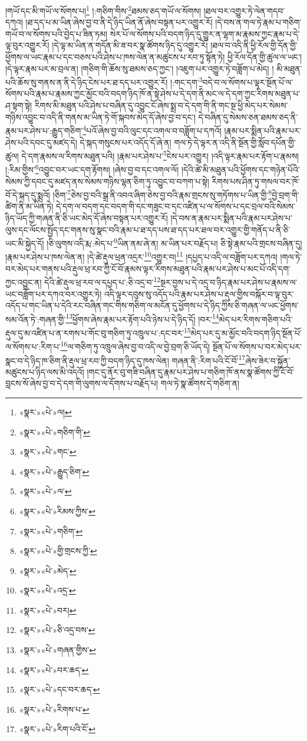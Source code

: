 །གཡོ་དང་མི་གཡོ་ལ་སོགས་པ།\footnote{«སྣར་»«པེ་»ལ།} །:གཅིག་གིས་\footnote{«སྣར་»«པེ་»གཅིག་གི་}ཐམས་ཅད་གཡོ་ལ་སོགས། །ཐལ་བར་འགྱུར་ཏེ་ལེན་གདབ་དཀའ། །ཐ་དད་པ་མ་ཡིན་ཞེས་བྱ་བ་ནི་དེ་ཉིད་ཡིན་ནོ་ཞེས་བསྟན་པར་འགྱུར་རོ། །དེ་བས་ན་གལ་ཏེ་རྣམ་པ་གཅིག་གཡོ་བ་ལ་སོགས་པའི་བྱེད་པ་ཟིན་ཏམ། སེར་པོ་ལ་སོགས་པའི་བདག་ཉིད་དུ་གྱུར་ན་ལྷག་མ་རྣམས་ཀྱང་རྣམ་པ་དེ་ལྟ་བུར་འགྱུར་རོ། །དེ་ལྟ་མ་ཡིན་ན་གདོན་མི་ཟ་བར་སྣ་ཚོགས་ཉིད་དུ་འགྱུར་རོ། །ཐལ་བ་འདི་ནི་ཕྱི་རོལ་གྱི་དོན་གྱི་ཕྱོགས་ལ་ཡང་རྣམ་པ་དང་བཅས་པའི་ཤེས་པ་ཁས་ལེན་ན་མཚུངས་པ་རབ་ཏུ་སྟོན་ཏེ། ཕྱི་རོལ་དོན་གྱི་ཚུལ་ལ་ཡང་། །དེ་ལྟར་རྣམ་པར་མ་བྲལ་ན། །གཅིག་གི་ཆོས་སུ་ཐམས་ཅད་ཀྱང་། །འཇུག་པར་འགྱུར་ཏེ་བཟློག་པ་མེད། །
མི་མཐུན་པའི་ཆོས་སུ་གནས་ན་ནི་དེ་ཉིད་ངེས་པར་ཐ་དད་པར་འགྱུར་རོ། །:གང་དག་\footnote{«སྣར་»«པེ་»གང་}བདེ་བ་ལ་སོགས་པ་ལྟར་སྔོན་པོ་ལ་སོགས་པའི་རྣམ་པ་རྣམས་ཀྱང་མྱོང་བའི་བདག་ཉིད་ཁོ་ན་སྟེ་ཤེས་པ་དེ་དག་ནི་མང་ལ་དེ་དག་ཀྱང་རིགས་མཐུན་པ་ཤ་སྟག་སྟེ། རིགས་མི་མཐུན་པའི་ཤེས་པ་བཞིན་དུ་འབྱུང་ངོ་ཞེས་སྨྲ་བ་དེ་དག་གི་ནི་གང་སྔ་ཕྱི་མེད་པར་སེམས་གཉིས་འབྱུང་བ་འདི་ནི་གནས་མ་ཡིན་ཏེ་གོ་སྐབས་མེད་དོ་ཞེས་བྱ་བ་དང་། དེ་བཞིན་དུ་སེམས་ཅན་ཐམས་ཅད་ནི་རྣམ་པར་ཤེས་པ་:རྒྱུད་གཅིག་\footnote{«སྣར་»«པེ་»རྒྱུད་ཅིག་}པའོ་ཞེས་བྱ་བའི་ལུང་དང་འགལ་བ་བཟློག་པ་དཀའོ། །རྣམ་པར་སྨིན་པའི་རྣམ་པར་ཤེས་པའི་དབང་དུ་མཛད་དེ། དེ་སྐད་གསུངས་པར་འདོད་དོ་ཞེ་ན། གལ་ཏེ་དེ་ལྟར་ན་འདི་ནི་སྔོན་གྱི་སློབ་དཔོན་གྱི་ཚུལ། དེ་དག་རྣམས་ལ་རིགས་མཐུན་པའི། །རྣམ་པར་ཤེས་པ་\footnote{«སྣར་»«པེ་»ལ་}ངེས་པར་འགྱུར། །འདི་ལྟར་རྣམ་པར་རྟོག་པ་རྣམས། །:རིམ་གྱིས་\footnote{«སྣར་»«པེ་»རིམས་ཀྱིས་}འབྱུང་བར་ཡང་དག་རྟོགས། །ཞེས་བྱ་བ་དང་འགལ་ལོ། །དེའི་ཚེ་མི་མཐུན་པའི་ཕྱོགས་དང་གཉེན་པོའི་སེམས་ཀྱི་དབང་དུ་མཛད་ནས་སེམས་གཉིས་ལྷན་ཅིག་ཏུ་འབྱུང་བ་བཀག་པ་སྟེ། རིགས་པས་ཤིན་ཏུ་གསལ་བར་ཁོ་བོ་དེ་སྐད་དུ་སྨྲའོ། །ཅིག་\footnote{«སྣར་»«པེ་»གཅིག་}ཅེས་བྱ་བའི་སྒྲ་ནི་འབའ་ཞིག་ཅེས་བྱ་བའི་རྣམ་གྲངས་སུ་གཏོགས་པ་ཡིན་གྱི་\footnote{«སྣར་»«པེ་»གྱི་གྲངས་ཀྱི་}བྱེ་བྲག་གི་ཚིག་ནི་མ་ཡིན་ཏེ། དེ་དག་ལ་བདག་དང་བདག་གི་དང་གཟུང་བ་དང་འཛིན་པ་ལ་སོགས་པ་དང་བྲལ་བའི་སེམས་ཉིད་ཡོད་ཀྱི་གཞན་ནི་ཅི་ཡང་མེད་དོ་ཞེས་བསྟན་པར་འགྱུར་རོ། །དེ་བས་ན་རྣམ་པར་སྨིན་པའི་རྣམ་པར་ཤེས་པ་ལུས་དང་ལོངས་སྤྱོད་དང་གནས་སུ་སྣང་བའི་རྣམ་པ་ཐ་དད་པས་ཐ་དད་པར་ཐལ་བར་འགྱུར་གྱི་གནོད་པ་ནི་ཅི་ཡང་མི་སྐྱེད་དོ། །ཅི་ལུགས་འདི་རྨ་:མེད་པ་\footnote{«སྣར་»«པེ་»མེད་}ཡིན་ནམ་ཞེ་ན། མ་ཡིན་པར་བརྗོད་པ། ཅི་སྟེ་རྣམ་པའི་གྲངས་བཞིན་དུ། །རྣམ་པར་ཤེས་པ་ཁས་ལེན་ན། །དེ་ཚེ་རྡུལ་ཕྲན་འདྲར་\footnote{«སྣར་»«པེ་»འདྲ་}འགྱུར་བ།\footnote{«སྣར་»«པེ་»བར།} །དཔྱད་པ་འདི་ལ་བཟློག་པར་དཀའ། །གལ་ཏེ་བར་མེད་པར་གནས་པའི་རྡུལ་ཕྲ་རབ་ཀྱི་ངོ་བོ་རྣམས་ལྟར་རིགས་མཐུན་པའི་རྣམ་པར་ཤེས་པ་མང་པོ་འདི་དག་ཀྱང་འབྱུང་ན། དེའི་ཚེ་རྡུལ་ཕྲ་རབ་ལ་དཔྱད་པ་:ཅི་འདྲ་བ་\footnote{«སྣར་»«པེ་»ཅི་འདྲ་བས་}སྔར་བྱས་པ་དེ་འདྲ་བ་ཉིད་རྣམ་པར་ཤེས་པ་རྣམས་ལ་ཡང་བཟློག་པར་དཀའ་བར་འགྱུར་ཏེ། འདི་ལྟར་དབུས་སུ་འདོད་པའི་རྣམ་པར་ཤེས་པ་རྡུལ་གྱིས་བསྐོར་བ་ལྟ་བུར་འདོད་པ་གང་ཡིན་པ་དེའི་རང་བཞིན་གང་གིས་གཅིག་ལ་མངོན་དུ་ཕྱོགས་པ་དེ་ཉིད་ཀྱིས་ཅི་གཞན་ལ་ཡང་ཕྱོགས་སམ་འོན་ཏེ་:གཞན་གྱི་\footnote{«སྣར་»«པེ་»གཞན་གྱིས་}ཕྱོགས་ཞེས་རྣམ་པར་རྟོག་པའི་ཉེས་པ་དེ་ཉིད་དོ། །བར་\footnote{«སྣར་»«པེ་»བར་ཆད་}མེད་པར་རིགས་གཅིག་པའི་རྡུལ་དུ་མ་འཛིན་པ་ན་རགས་པ་གོང་བུ་གཅིག་ཏུ་འཁྲུལ་པ་:དང་བར་\footnote{«སྣར་»«པེ་»དང་བར་ཆད་}མེད་པར་དུ་མ་མྱོང་བའི་བདག་ཉིད་སྔོན་པོ་ལ་སོགས་པ་:རིག་པ་\footnote{«སྣར་»«པེ་»རིགས་པ་}ལ་གཅིག་ཏུ་འཁྲུལ་ཞེས་བྱ་བ་འདི་ལ་བྱེ་བྲག་ཅི་ཡོད་དེ། སྔོན་པོ་ལ་སོགས་པ་བར་མེད་པར་སྣང་བ་དེ་ཉིད་ཁ་ཅིག་ནི་རྡུལ་ཕྲ་རབ་ཀྱི་བདག་ཉིད་དུ་ཁས་ལེན། གཞན་ནི་:རིག་པའི་ངོ་བོ་\footnote{«སྣར་»«པེ་»རིག་པའི་ངོ་}ཞེས་ཟེར་བ་སྐྱོན་མཚུངས་པ་ཉིད་ལས་མི་འདའོ། །གང་དུ་ནོར་བུ་གཟི་བཞིན་དུ་རྣམ་པར་ཤེས་པ་གཅིག་ཁོ་ནས་སྣ་ཚོགས་ཀྱི་ངོ་བོ་བླངས་སོ་ཞེས་བྱ་བ་དེ་དག་གི་ལུགས་ལ་དོགས་པ་བརྗོད་པ། གལ་ཏེ་སྣ་ཚོགས་དེ་གཅིག་ན། 